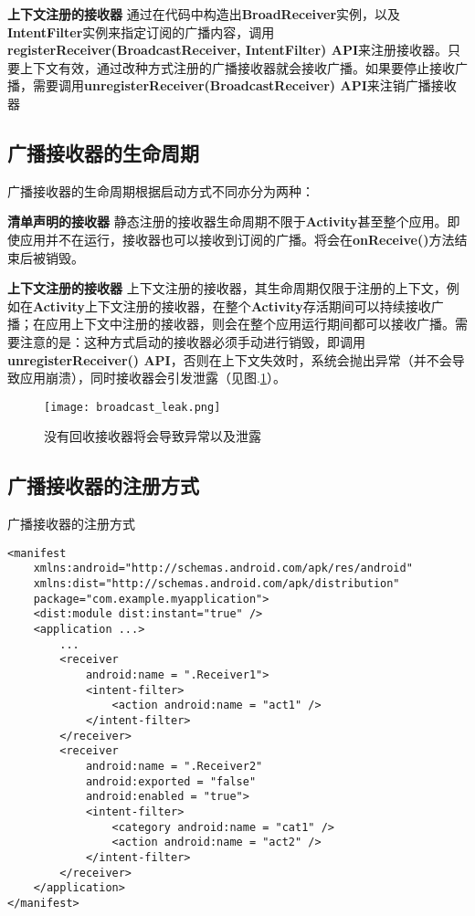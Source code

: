 \textbf{上下文注册的接收器 }\label{declaration:receiver in context} 通过在代码中构造出\textbf{BroadReceiver}实例，以及\textbf{IntentFilter}实例来指定订阅的广播内容，调用\textbf{registerReceiver(BroadcastReceiver, IntentFilter) API}来注册接收器。只要上下文有效，通过改种方式注册的广播接收器就会接收广播。如果要停止接收广播，需要调用\textbf{unregisterReceiver(BroadcastReceiver) API}来注销广播接收器

\subsection{广播接收器的生命周期}
广播接收器的生命周期根据启动方式不同亦分为两种\cite{broadcast}：

\textbf{清单声明的接收器 } 静态注册的接收器生命周期不限于\textbf{Activity}甚至整个应用。即使应用并不在运行，接收器也可以接收到订阅的广播。将会在\textbf{onReceive()}方法结束后被销毁。


\textbf{上下文注册的接收器 } 上下文注册的接收器，其生命周期仅限于注册的上下文，例如在\textbf{Activity}上下文注册的接收器，在整个\textbf{Activity}存活期间可以持续接收广播；在应用上下文中注册的接收器，则会在整个应用运行期间都可以接收广播。需要注意的是：这种方式启动的接收器必须手动进行销毁，即调用\textbf{unregisterReceiver() API}，否则在上下文失效时，系统会抛出异常（并不会导致应用崩溃），同时接收器会引发泄露（见图.\textcolor{red}{\ref{fig:broadcast_leak}}）。

\begin{figure}[htbp]
   \centering
   \texttt{[image: broadcast\_leak.png]} %
   \caption{没有回收接收器将会导致异常以及泄露}
   \label{fig:broadcast_leak}
\end{figure}

\subsection{广播接收器的注册方式}
\begin{listing}[htbp]
	\centering
	\caption{广播接收器的注册方式}
	\begin{verbatim}
<manifest 
	xmlns:android="http://schemas.android.com/apk/res/android"
	xmlns:dist="http://schemas.android.com/apk/distribution"
	package="com.example.myapplication">
	<dist:module dist:instant="true" />
	<application ...>
		...
		<receiver
			android:name = ".Receiver1">
			<intent-filter>
				<action android:name = "act1" />
			</intent-filter>
		</receiver>
		<receiver
			android:name = ".Receiver2"
			android:exported = "false"
			android:enabled = "true">
			<intent-filter>
				<category android:name = "cat1" />
				<action android:name = "act2" />
			</intent-filter>
		</receiver>
	</application>
</manifest>
	\end{verbatim}
	\label{declaration:receiver}
\end{listing}

